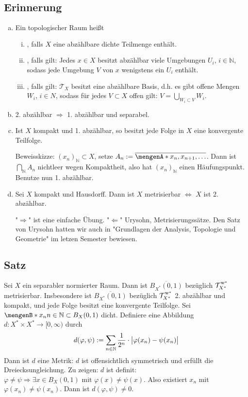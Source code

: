 \subsection[Erinnerung: separabel, 1. abzählbar, 2. abzählbar]{Erinnerung} %
\label{sub:511}
\begin{enumerate}[(a)]
	\item Ein topologischer Raum heißt
	\begin{enumerate}[(i)]
		\item {}, falls $X$ eine abzählbare dichte Teilmenge enthält.
		\item {}, falls gilt: Jedes $x \in X$ besitzt abzählbar viele Umgebungen $U_i$, $i \in \mathds{N}$, sodass jede Umgebung $V$ von $x$ wenigstens ein
		$U_i$ enthält.  
		\item {}, falls gilt: $\mathcal{T}_X$ besitzt eine abzählbare Basis, d.h. es gibt offene Mengen $W_i$, $i \in N$, sodass für jedes $V \subset X$ 
		offen gilt: $V= \bigcup_{W_i \subset V} W_i$.
	\end{enumerate}
	\item 2. abzählbar $\Rightarrow $ 1. abzählbar und separabel.
	\item Ist $X$ kompakt und 1. abzählbar, so besitzt jede Folge in $X$ eine konvergente Teilfolge.
	
	Beweisskizze: $(x_n)_{\mathds{N}} \subset X$, setze $A_n := \overline{\set{x_n, x_{n+1}, \ldots }}$. Dann ist $\bigcap_\mathds{N} A_n$ nichtleer wegen Kompaktheit, also
	hat $(x_n)_\mathds{N}$ einen Häufungspunkt. Benutze nun 1. abzählbar.
	\item Sei $X$ kompakt und Hausdorff. Dann ist $X$ metrisierbar $\iff$ $X$ ist 2. abzählbar.
	
	"$\Longrightarrow$" ist eine einfache Übung. "$\Longleftarrow$" Urysohn, Metrisierungssätze. Den Satz von Urysohn hatten wir auch in "Grundlagen der Analysis, Topologie 
	und Geometrie" im letzen Semester bewiesen.
\end{enumerate}

\subsection[Satz: Metrisierbarkeit von $\overline{B_{X^*}(0,1)}$ bezüglich der $\w^*$-Topologie]{Satz} %
\label{sub:512}
Sei $X$ ein separabler normierter Raum. Dann ist $\overline{B_{X^*}(0,1)}$ bezüglich $\weakTstar{X^*}$ metrisierbar. Insbesondere ist $\overline{B_{X^*}(0,1)}$ bezüglich
$\weakTstar{X^*}$ 2. abzählbar und kompakt, und jede Folge besitzt eine konvergente Teilfolge.
Sei $\set[x_n]{n \in \mathds{N}} \subset B_X(0,1)$ dicht. Definiere eine Abbildung $d: X^* \times X^* \to [0,\infty)$ durch
\[
	d(\varphi, \psi) := \sum_{n \in \mathds{N}} \frac{1}{2^n} \cdot \abs[\big]{\varphi(x_n) - \psi(x_n)}
\]
Dann ist $d$ eine Metrik: $d$ ist offensichtlich symmetrisch und erfüllt die Dreiecksungleichung. Zu zeigen: $d$ ist definit:
\(
	\varphi \not= \psi \Rightarrow \exists x \in B_X(0,1) \text{ mit } \varphi(x) \not= \psi(x).
\)
Also existiert $x_n$ mit $\varphi(x_n) \not= \psi(x_n)$. Dann ist $d(\varphi,\psi) \not= 0$.


